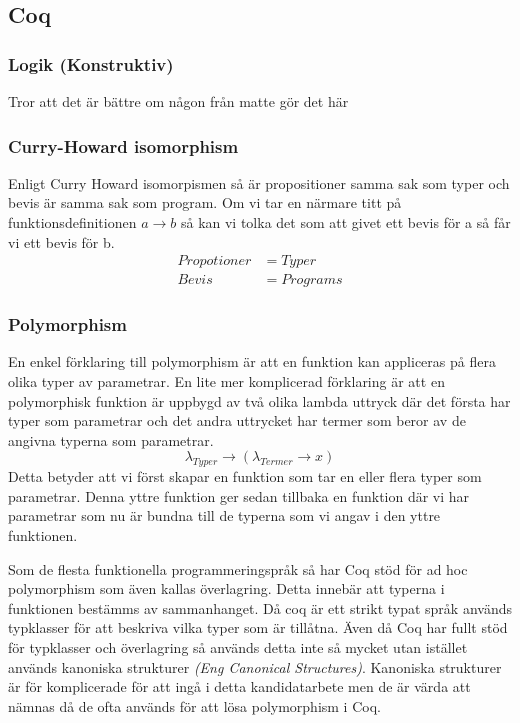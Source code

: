 \subsection{Coq}

\subsubsection{Logik (Konstruktiv)}
Tror att det är bättre om någon från matte gör det här

\subsubsection{Curry-Howard isomorphism}
Enligt Curry Howard isomorpismen så är propositioner samma sak som typer och
bevis är samma sak som program. Om vi tar en närmare titt på
funktionsdefinitionen $a \rightarrow b$ så kan vi tolka det som att givet ett
bevis för a så får vi ett bevis för b.
\begin{align*}
  Propotioner &= Typer \\
  Bevis       &= Programs
\end{align*}

\subsubsection{Polymorphism}
En enkel förklaring till polymorphism är att en funktion kan appliceras på
flera olika typer av parametrar. En lite mer komplicerad förklaring är att en
polymorphisk funktion är uppbygd av två olika lambda uttryck där det första har
typer som parametrar och det andra uttrycket har termer som beror av de angivna
typerna som parametrar.
\begin{equation}
  \lambda_{Typer} \rightarrow (\lambda_{Termer} \rightarrow x)
  \label{polymorphsk funktion}
\end{equation}
Detta betyder att vi först skapar en funktion som tar en eller flera
typer som parametrar. Denna yttre funktion ger sedan tillbaka en funktion
där vi har parametrar som nu är bundna till de typerna som vi angav i den
yttre funktionen.

Som de flesta funktionella programmeringspråk så har Coq stöd för ad hoc
polymorphism som även kallas överlagring. Detta innebär att typerna i
funktionen bestämms av sammanhanget. Då coq är ett strikt typat språk används
typklasser för att beskriva vilka typer som är tillåtna. Även då Coq har fullt
stöd för typklasser och överlagring så används detta inte så mycket utan
istället används kanoniska strukturer {\it (Eng Canonical Structures)}.
Kanoniska strukturer är för komplicerade för att ingå i detta kandidatarbete
men de är värda att nämnas då de ofta används för att lösa polymorphism i Coq.

